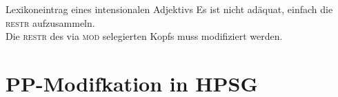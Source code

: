 \begin{frame}
  {Lexikoneintrag eines intensionalen Adjektivs}
  \onslide<+->
  \onslide<+->
  Es ist nicht adäquat, einfach die \textsc{restr} aufzusammeln.\\
  \onslide<+->
  Die \textsc{restr} des via \textsc{mod} selegierten Kopfs muss modifiziert werden.\\
  \onslide<+->
  \Halbzeile
  \centering 
\end{frame}


\section{PP-Modifkation in HPSG}

